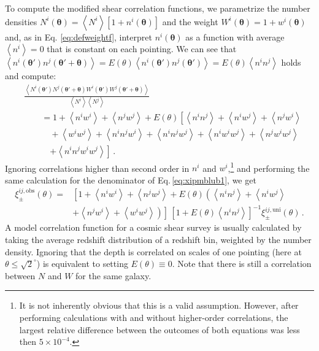 \documentclass{aa}
\renewcommand{\rm}{\mathrm}
\def\inv{^{-1}}
\def\b#1{\bm{#1}}
\def\la{\left<}
\def\ra{\right>}
\def\d{\rm{d}}
\def\bthp{\b \theta' + \b \theta}
\def\bth{\b \theta'}
\begin{document}
To compute the modified shear correlation functions, we parametrize the number densities \linebreak$N^{i}(\b \theta)=\la N^{i} \ra [1+n^{i}(\b \theta)]$ and the weight $W^{i}(\b \theta)=1+w^{i}(\b \theta)$ and, as in Eq. \eqref{eq:defweightf}, interpret $n^{i}(\b \theta)$ as a function with average $\la n^{i} \ra = 0$ that is constant on each pointing. We can see that $\la n^i(\bth)n^j(\bthp)\ra = E(\theta)\la n^i(\bth)n^j(\bth)\ra = E(\theta)\la n^i n^j \ra$ holds and compute:
\begin{align}
&\frac{\la N^i(\bth)N^j(\bthp)W^i(\bth)W^j(\bthp)\ra}{\la N^i\ra \la N^j\ra } \nonumber\\
&\qquad =  1 + \la n^iw^i\ra + \la n^j w^j\ra + E(\theta)\left[ \la n^in^j\ra + \la n^i w^j \ra  + \la n^jw^i\ra \right. \nonumber\\
& \qquad\quad + \la w^iw^j\ra + \la n^in^jw^i\ra + \la n^in^jw^j\ra + \la n^iw^iw^j\ra 
+ \la n^jw^iw^j\ra \nonumber\\
& \qquad\quad\left.+ \la n^in^jw^iw^j\ra  \right] \, .
 \end{align}
Ignoring correlations higher than second order in $n^i$ and $w^i$,\footnote{It is not inherently obvious that this is a valid assumption. However, after performing calculations with and without higher-order correlations, the largest relative difference between the outcomes of both equations was less then $5\times 10^{-4}$.} and performing the same calculation for the denominator of Eq.\,\eqref{eq:xipmblub1}, we get
 \begin{align}
 \xi^{ij,\rm{obs}}_\pm(\theta) = & \left[ 1 + \la n^iw^i\ra + \la n^jw^j\ra + E(\theta)\left(\la n^in^j\ra + \la n^iw^j\ra \right.\right. \nonumber\\
 &\left.\left. + \la n^j w^i\ra + \la w^iw^j\ra\right)\right]\, \left[1+E(\theta)\la n^i n^j\ra \right]\inv\xi^{ij,\rm{uni}}_\pm (\theta) \, .
 \end{align}
 A model correlation function for a cosmic shear survey is usually calculated by taking the average redshift distribution of a redshift bin, weighted by the number density.
 Ignoring that the depth is correlated on scales of one pointing (here at $\theta \leq \sqrt{2}^\circ$) is equivalent to setting $E(\theta)\equiv 0$. Note that there is still a correlation between $N$ and $W$ for the same galaxy.
\end{document}
